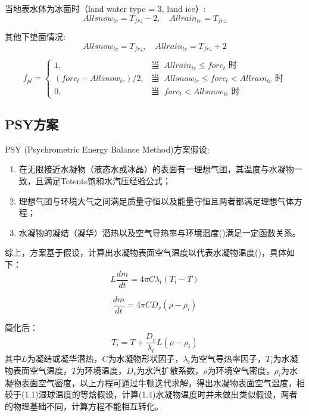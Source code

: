当地表水体为冰面时（land water type = 3, land ice）:
\begin{equation}
Allsnow_{tc} = T_{frz} - 2,\quad Allrain_{tc} = T_{frz}
\end{equation}

其他下垫面情况:
\begin{equation}
Allsnow_{tc} = T_{frz},\quad Allrain_{tc} = T_{frz} +2
\end{equation}

\begin{equation*}
f_{pl}= \begin{cases}
1, & \text{当 }\ Allrain_{tc}\le forc_t \text{ 时}\\
(forc_t - Allsnow_{tc})/2, & \text{当 }\ Allsnow_{tc}\le forc_t < Allrain_{tc} \text{ 时} \\
0, & \text{当 }\ forc_t < Allsnow_{tc} \text{ 时}
\end{cases}
\end{equation*}


\subsection{PSY方案}
PSY (Psychrometric Energy Balance Method)方案假设:
\begin{enumerate}
    \item 在无限接近水凝物（液态水或冰晶）的表面有一理想气团，其温度与水凝物一致，且满足Tetents饱和水汽压经验公式；
    \item 理想气团与环境大气之间满足质量守恒以及能量守恒且两者都满足理想气体方程；
    \item 水凝物的凝结（凝华）潜热以及空气导热率与环境温度(\textcelsius)满足一定函数关系。
\end{enumerate}

综上，方案基于假设，计算出水凝物表面空气温度以代表水凝物温度(\textcelsius)，具体如下：
\begin{equation}
L\frac{dm}{dt}=4\pi C\lambda_t(T_i - T)
\end{equation}

\begin{equation}
\frac{dm}{dt}=4\pi CD_v(\rho - \rho_i)
\end{equation}

简化后：
\begin{equation}
T_i = T + \frac{D_v}{\lambda_{t}}L(\rho - \rho_i)
\end{equation}
%
其中$L$为凝结或凝华潜热，$C$为水凝物形状因子，$\lambda_t$为空气导热率因子，$T_i$为水凝物表面空气温度，$T$为环境温度，$D_v$为水汽扩散系数，$\rho$为环境空气密度，$\rho_i$为水凝物表面空气密度，以上方程可通过牛顿迭代求解，得出水凝物表面空气温度，相较于(1.1)湿球温度的等焓假设，计算(1.4)水凝物温度时并未做出类似假设，两者的物理基础不同，计算方程不能相互转化。

